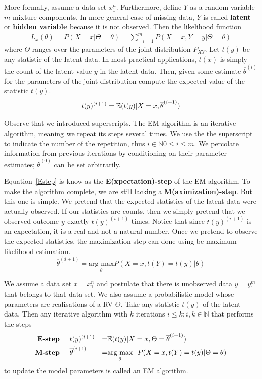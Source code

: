 More formally, assume a data set $ x_{1}^{n} $. Furthermore, define $ Y $ as a random variable $ m $
mixture components. In more general case of missing data, $ Y $ is called \textbf{latent} or \textbf{hidden variable}
because it is not observed. Then the likelihood function
\begin{align}
L_{x}(\theta) = P(X=x|\Theta=\theta) = \underset{i=1}{\overset{m}{\sum}} P(X=x, Y=y|\Theta=\theta)
\end{align}
where $ \Theta $ ranges over the parameters of the joint distribution $ P_{XY} $. Let $ t(y) $ be any
statistic of the latent data. In most practical applications, $ t(x) $ is simply the count of the latent
value $ y $ in the latent data. Then, given some estimate $ \overline{\theta}^{(i)} $ for the parameters of the joint
distribution compute the expected value of the statistic $ t(y) $.
\begin{equation} \label{Estep}
t(y)^{(i+1)} = \mathbb{E}(t(y)|X = x,\overline{\theta}^{(i+1)})
\end{equation} 

Observe that we introduced superscripts. The EM algorithm is an iterative algorithm, meaning we repeat its steps several
times. We use the the superscript to indicate the number of the repetition, thus $ i \in \mathbb{N} 0 \leq i \leq m $. We percolate
information from previous iterations by conditioning on their parameter estimates; $ \overline{\theta}^{(0)} $ can be set arbitrarily.

Equation~\eqref{Estep} is know as the \textbf{E(xpectation)-step} of the EM algorithm. To make the algorithm complete, we are still lacking a
\textbf{M(aximization)-step}. But this one is simple. We pretend that the expected statistics of the latent data were actually observed. If
our statistics are counts, then we simply pretend that we observed outcome $ y $ exactly $ t(y)^{(i+1)} $ times. Notice that since $ t(y)^{(i+1)} $
is an expectation, it is a real and not a natural number. Once we pretend to observe the expected statistics, the maximization step can done
using be maximum likelihood estimation.
\begin{equation} \label{Mstep}
\overline{\theta}^{(i+1)} = \underset{\theta}{\mbox{arg max}} P(X=x, t(Y) = t(y)|\theta)
\end{equation}

\begin{Definition}[EM algorithm]\label{def:EM}
We assume a data set $ x = x_{1}^{n} $ and postulate that there is unobserved data $ y = y_{1}^{m} $ that belongs to that data set. We also
assume a probabilistic model whose parameters are realisations of a RV $ \Theta $. Take any
statistic $ t(y) $ of the latent data. Then any iterative algorithm with $ k $ iterations $ i \leq k; i,k \in \mathbb{N} $ that performs the steps
\begin{align*}
\mbox{\textbf{E-step} }~~~& t(y)^{(i+1)} &=& \mathbb{E}(t(y)|X = x, \Theta = \overline{\theta}^{(i+1)}) \\
\mbox{\textbf{M-step} }~~~& \overline{\theta}^{(i+1)} &=& \underset{\theta}{\mbox{arg max}}~~P(X=x, t(Y) = t(y)|\Theta = \theta) 
\end{align*}
to update the model parameters is called an EM algorithm.
\end{Definition}

